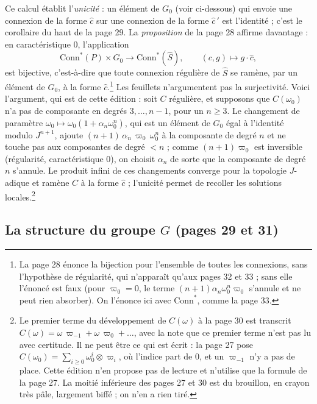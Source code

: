 \documentclass[11pt,a4paper]{article}
\begin{document}
Ce calcul établit l'\emph{unicité} : un élément de $G_0$ (voir ci-dessous)
qui envoie une connexion de la forme $\widehat{c}$ sur une connexion de la
forme $\widehat{c}\,'$ est l'identité ; c'est le corollaire du haut de la
page 29. La \emph{proposition} de la page 28 affirme davantage : en
caractéristique $0$, l'application
\[
  \mathrm{Conn}^*(P) \times G_0 \longrightarrow
  \mathrm{Conn}^*(\widehat{S}), \qquad (c, g) \longmapsto g \cdot \widehat{c},
\]
est bijective, c'est-à-dire que toute connexion régulière de $\widehat{S}$
se ramène, par un élément de $G_0$, à la forme
$\widehat{c}$.\footnote{La page 28 énonce la bijection pour l'ensemble de
toutes les connexions, sans l'hypothèse de régularité, qui n'apparaît
qu'aux pages 32 et 33 ; sans elle l'énoncé est faux (pour $\varpi_0 = 0$, le
terme $(n+1)\alpha_n\omega_0^n\varpi_0$ s'annule et ne peut rien absorber).
On l'énonce ici avec $\mathrm{Conn}^*$, comme la page 33.} Les feuillets
n'argumentent pas la surjectivité. Voici l'argument, qui est de cette
édition : soit $C$ régulière, et supposons que $C(\omega_0)$ n'a pas de
composante en degrés $3, \ldots, n-1$, pour un $n \geqslant 3$. Le changement
de paramètre $\omega_0 \mapsto \omega_0(1 + \alpha_n\omega_0^n)$, qui est un
élément de $G_0$ égal à l'identité modulo $J^{n+1}$, ajoute
$(n+1)\,\alpha_n\,\varpi_0\,\omega_0^n$ à la composante de degré $n$ et ne
touche pas aux composantes de degré $< n$ ; comme $(n+1)\varpi_0$ est inversible (régularité,
caractéristique $0$), on choisit $\alpha_n$ de sorte que la composante de
degré $n$ s'annule. Le produit infini de ces changements converge pour la
topologie $J$-adique et ramène $C$ à la forme $\widehat{c}$ ; l'unicité
permet de recoller les solutions locales.\footnote{Le premier terme du
développement de $C(\omega)$ à la page 30 est transcrit
$C(\omega) = \omega\,\varpi_{-1} + \omega\,\varpi_0 + \ldots$, avec la note
que ce premier terme n'est pas lu avec certitude. Il ne peut être ce qui est
écrit : la page 27 pose $C(\omega_0) = \sum_{i \geqslant 0} \omega_0^i \otimes
\varpi_i$, où l'indice part de $0$, et un $\varpi_{-1}$ n'y a pas de place.
Cette édition n'en propose pas de lecture et n'utilise que la formule de la
page 27. La moitié inférieure des pages 27 et 30 est du brouillon, en crayon
très pâle, largement biffé ; on n'en a rien tiré.}

\subsection*{La structure du groupe $G$ (pages 29 et 31)}
\end{document}
